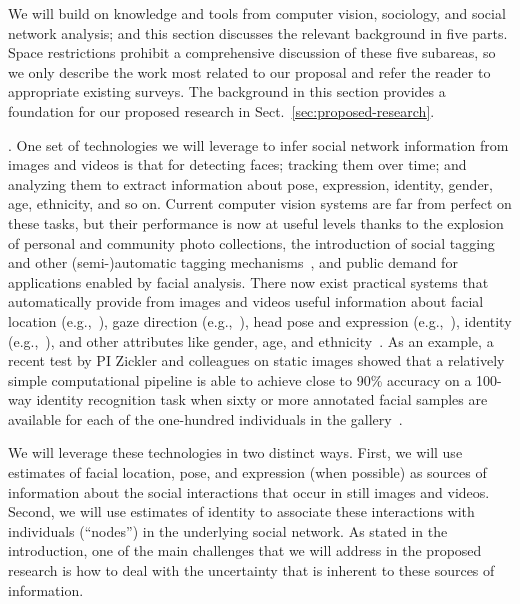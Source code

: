 
We will build on knowledge and tools from computer vision, sociology, and social network analysis; and this section discusses the relevant background in five parts. Space restrictions prohibit a comprehensive discussion of these five subareas, so we only describe the work most related to our proposal and refer the reader to appropriate existing surveys. The background in this section provides a foundation for our proposed research in Sect.~\ref{sec:proposed-research}.

. One set of technologies we will leverage to infer social network information from images and videos is that for detecting faces; tracking them over time; and analyzing them to extract information about pose, expression, identity, gender, age, ethnicity, and so on.  Current computer vision systems are  far from perfect on these tasks, but their performance is now at useful levels thanks to the explosion of personal and community photo collections, the introduction of social tagging~\cite{Stone2008,Stone2010} and other (semi-)automatic tagging mechanisms~\cite{berg2004naf,berg2005sp,Everingham06a,huang:lfw}, and public demand for applications enabled by facial analysis. There now exist practical systems that automatically provide from images and videos useful information about facial location (e.g.,~\cite{ViolaJones,Zhang:detect,Comaniciu:track}), gaze direction (e.g.,~\cite{Hanson}), head pose and expression (e.g.,~\cite{Murphy-Chutorian:pose,Matthews:AAM,Lucey:AAM,Mumford:face,Yacoob:expression,delaTorre:expression,Essa:expression,huang:lfw,HolubMoreelsPeronaFG08}), identity (e.g.,~\cite{PintoZickler2011}), and other attributes like gender, age, and ethnicity~\cite{LNCS53050340}. As  an example, a recent test by PI Zickler and colleagues on static images showed that a relatively simple computational pipeline is able to achieve close to 90\% accuracy on a 100-way identity recognition task when sixty or more annotated facial samples are available for each of the one-hundred individuals in the gallery~\cite{PintoZickler2011}. 

We will leverage these technologies in two distinct ways. First, we will use estimates of facial location, pose, and expression (when possible) as sources of information about the social interactions that occur in still images and videos. Second, we will use estimates of identity to associate these interactions with individuals (``nodes'') in the underlying social network. As stated in the introduction, one of the main challenges that we will address  in the proposed research is how to deal with the uncertainty that is inherent to these sources of information. 

